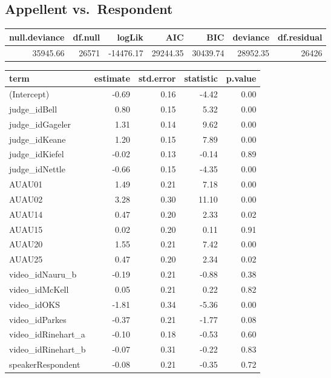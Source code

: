 \documentclass{monashthesis}
\begin{document}
\hypertarget{appellent-vs.-respondent}{%
\subsection{Appellent vs.~Respondent}\label{appellent-vs.-respondent}}

\begin{tabular}{r|r|r|r|r|r|r}
\hline
null.deviance & df.null & logLik & AIC & BIC & deviance & df.residual\\
\hline
35945.66 & 26571 & -14476.17 & 29244.35 & 30439.74 & 28952.35 & 26426\\
\hline
\end{tabular}

\begin{tabular}{l|r|r|r|r}
\hline
term & estimate & std.error & statistic & p.value\\
\hline
(Intercept) & -0.69 & 0.16 & -4.42 & 0.00\\
\hline
judge\_idBell & 0.80 & 0.15 & 5.32 & 0.00\\
\hline
judge\_idGageler & 1.31 & 0.14 & 9.62 & 0.00\\
\hline
judge\_idKeane & 1.20 & 0.15 & 7.89 & 0.00\\
\hline
judge\_idKiefel & -0.02 & 0.13 & -0.14 & 0.89\\
\hline
judge\_idNettle & -0.66 & 0.15 & -4.35 & 0.00\\
\hline
AUAU01 & 1.49 & 0.21 & 7.18 & 0.00\\
\hline
AUAU02 & 3.28 & 0.30 & 11.10 & 0.00\\
\hline
AUAU14 & 0.47 & 0.20 & 2.33 & 0.02\\
\hline
AUAU15 & 0.02 & 0.20 & 0.11 & 0.91\\
\hline
AUAU20 & 1.55 & 0.21 & 7.42 & 0.00\\
\hline
AUAU25 & 0.47 & 0.20 & 2.34 & 0.02\\
\hline
video\_idNauru\_b & -0.19 & 0.21 & -0.88 & 0.38\\
\hline
video\_idMcKell & 0.05 & 0.21 & 0.22 & 0.82\\
\hline
video\_idOKS & -1.81 & 0.34 & -5.36 & 0.00\\
\hline
video\_idParkes & -0.37 & 0.21 & -1.77 & 0.08\\
\hline
video\_idRinehart\_a & -0.10 & 0.18 & -0.53 & 0.60\\
\hline
video\_idRinehart\_b & -0.07 & 0.31 & -0.22 & 0.83\\
\hline
speakerRespondent & -0.08 & 0.21 & -0.35 & 0.72\\

\end{tabular}
\end{document}
